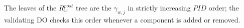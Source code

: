 


The leaves of the $R^{post}_w$ tree are the $\gamma_{w,j}$ in strictly increasing $PID$ order; the
validating DO checks this order whenever a component is added or removed.






